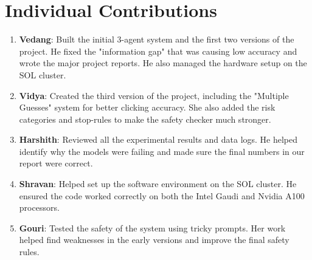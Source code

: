 \documentclass[11pt]{article}
\begin{document}
\section{Individual Contributions}
\begin{enumerate}[label=\textbf{\arabic*.}]
    \item \textbf{Vedang}: Built the initial 3-agent system and the first two versions of the project. He fixed the "information gap" that was causing low accuracy and wrote the major project reports. He also managed the hardware setup on the SOL cluster.
    \item \textbf{Vidya}: Created the third version of the project, including the "Multiple Guesses" system for better clicking accuracy. She also added the risk categories and stop-rules to make the safety checker much stronger.
    \item \textbf{Harshith}: Reviewed all the experimental results and data logs. He helped identify why the models were failing and made sure the final numbers in our report were correct.
    \item \textbf{Shravan}: Helped set up the software environment on the SOL cluster. He ensured the code worked correctly on both the Intel Gaudi and Nvidia A100 processors.
    \item \textbf{Gouri}: Tested the safety of the system using tricky prompts. Her work helped find weaknesses in the early versions and improve the final safety rules.
\end{enumerate}
\end{document}
